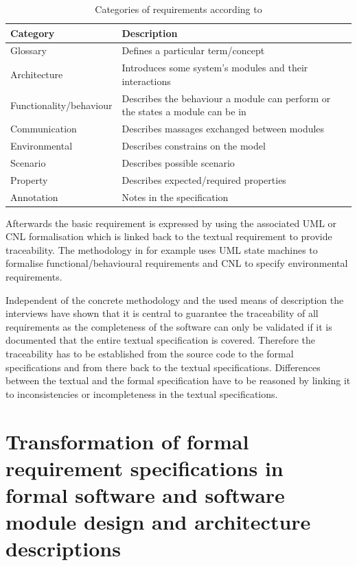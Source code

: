 \documentclass{./template/openetcs_report}
\begin{document}
\begin{table}[h]

\caption{Categories of requirements according to \citep{Cimatti.2008c}}
\label{tab:categories of requirements}

\begin{tabular}{|p{4.5cm}|p{9.3cm}|}
\hline
\textbf{Category}  &  \textbf{Description} \\ \hline
Glossary & Defines a particular term/concept \\ \hline
Architecture &  Introduces some system's modules and their interactions \\ \hline
Functionality/behaviour & Describes the behaviour a module can perform or the states a module can be in \\ \hline
Communication &  Describes massages exchanged between modules \\\hline
Environmental &  Describes constrains on the model \\\hline
Scenario & Describes possible scenario \\\hline
Property &  Describes expected/required properties \\\hline
Annotation & Notes in the specification\\
\hline
\end{tabular}

\end{table}

Afterwards the basic requirement is expressed by using the associated UML or CNL formalisation which is linked back to the textual requirement  to provide traceability. The methodology in \citep{Cimatti.2008c} for example uses UML state machines to  formalise  functional/behavioural requirements and CNL to specify environmental requirements. 

Independent of the concrete methodology and the used means of description the interviews have shown that it is central to guarantee the traceability of all requirements as the completeness of the software can only be validated if it is documented that the entire textual specification is covered. Therefore the traceability has to be established from the source code to the formal specifications and from there back to the textual specifications. Differences between the textual and the formal specification have to be reasoned by linking it to  inconsistencies or incompleteness in the textual specifications. 


\section{Transformation of formal requirement specifications in formal software and software module design and architecture descriptions}
\end{document}
